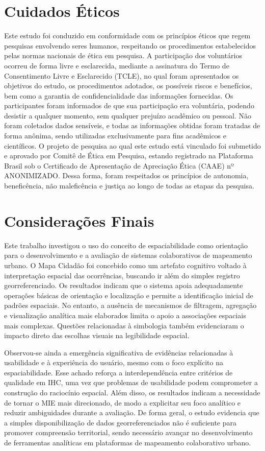 \documentclass[12pt]{article}
\begin{document}
\section{Cuidados Éticos}

Este estudo foi conduzido em conformidade com os princípios éticos que regem pesquisas envolvendo seres humanos, respeitando os procedimentos estabelecidos pelas normas nacionais de ética em pesquisa. A participação dos voluntários ocorreu de forma livre e esclarecida, mediante a assinatura do Termo de Consentimento Livre e Esclarecido (TCLE), no qual foram apresentados os objetivos do estudo, os procedimentos adotados, os possíveis riscos e benefícios, bem como a garantia de confidencialidade das informações fornecidas. Os participantes foram informados de que sua participação era voluntária, podendo desistir a qualquer momento, sem qualquer prejuízo acadêmico ou pessoal. Não foram coletados dados sensíveis, e todas as informações obtidas foram tratadas de forma anônima, sendo utilizadas exclusivamente para fins acadêmicos e científicos. O projeto de pesquisa ao qual este estudo está vinculado foi submetido e aprovado por Comitê de Ética em Pesquisa, estando registrado na Plataforma Brasil sob o Certificado de Apresentação de Apreciação Ética (CAAE) nº ANONIMIZADO.
Dessa forma, foram respeitados os princípios de autonomia, beneficência, não maleficência e justiça ao longo de todas as etapas da pesquisa.



\section{Considerações Finais}

Este trabalho investigou o uso do conceito de espaciabilidade como orientação para o desenvolvimento e a avaliação de sistemas colaborativos de mapeamento urbano. O Mapa Cidadão foi concebido como um artefato cognitivo voltado à interpretação espacial das ocorrências, buscando ir além do simples registro georreferenciado. Os resultados indicam que o sistema apoia adequadamente operações básicas de orientação e localização e permite a identificação inicial de padrões espaciais. No entanto, a ausência de mecanismos de filtragem, agregação e visualização analítica mais elaborados limita o apoio a associações espaciais mais complexas. Questões relacionadas à simbologia também evidenciaram o impacto direto das escolhas visuais na legibilidade espacial.

Observou-se ainda a emergência significativa de evidências relacionadas à usabilidade e à experiência do usuário, mesmo com o foco explícito na espaciabilidade. Esse achado reforça a interdependência entre critérios de qualidade em IHC, uma vez que problemas de usabilidade podem comprometer a construção do raciocínio espacial. Além disso, os resultados indicam a necessidade de tornar o MIE mais direcionado, de modo a explicitar seu foco analítico e reduzir ambiguidades durante a avaliação. De forma geral, o estudo evidencia que a simples disponibilização de dados georreferenciados não é suficiente para promover compreensão territorial, sendo necessário avançar no desenvolvimento de ferramentas analíticas em plataformas de mapeamento colaborativo urbano.
\end{document}
